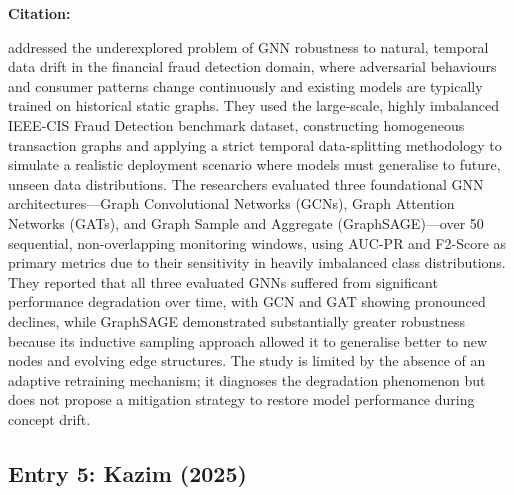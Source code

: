 \documentclass[12pt, a4paper]{article}
\newenvironment{surveyentry}[1]{%
  \vspace{6pt}
  \noindent\textbf{\color{navyblue}#1}\par
  \vspace{2pt}
  \noindent\hspace{1em}%
  \begin{minipage}[t]{0.97\linewidth}
}{%
  \end{minipage}
  \vspace{10pt}
}
\begin{document}
\begin{surveyentry}{Citation: \cite{ieeeaccess2025drift}}
\cite{ieeeaccess2025drift} addressed the underexplored problem of GNN robustness to natural, temporal data drift in the financial fraud detection domain, where adversarial behaviours and consumer patterns change continuously and existing models are typically trained on historical static graphs. They used the large-scale, highly imbalanced IEEE-CIS Fraud Detection benchmark dataset, constructing homogeneous transaction graphs and applying a strict temporal data-splitting methodology to simulate a realistic deployment scenario where models must generalise to future, unseen data distributions. The researchers evaluated three foundational GNN architectures---Graph Convolutional Networks (GCNs), Graph Attention Networks (GATs), and Graph Sample and Aggregate (GraphSAGE)---over 50 sequential, non-overlapping monitoring windows, using AUC-PR and F2-Score as primary metrics due to their sensitivity in heavily imbalanced class distributions. They reported that all three evaluated GNNs suffered from significant performance degradation over time, with GCN and GAT showing pronounced declines, while GraphSAGE demonstrated substantially greater robustness because its inductive sampling approach allowed it to generalise better to new nodes and evolving edge structures. The study is limited by the absence of an adaptive retraining mechanism; it diagnoses the degradation phenomenon but does not propose a mitigation strategy to restore model performance during concept drift.
\end{surveyentry}

\subsection*{Entry 5: Kazim (2025)}
\end{document}
